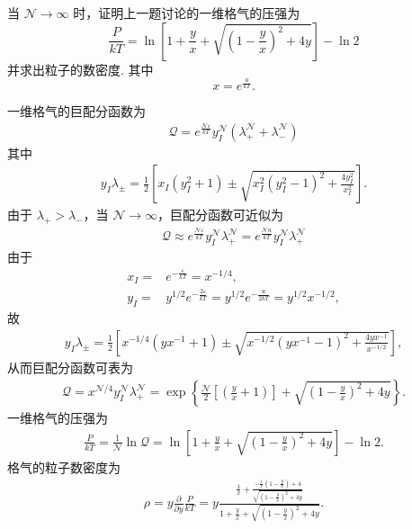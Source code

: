 \documentclass{assignment}
\begin{document}
\begin{prob}
    当 $\mathcal{N}\rightarrow\infty$ 时，证明上一题讨论的一维格气的压强为
    \[
        \frac{P}{kT}=\ln\left[1+\frac{y}{x}+\sqrt{\left(1-\frac{y}{x}\right)^2+4y}\right]-\ln 2
    \]
    并求出粒子的数密度. 其中
    \[
        x=e^{\frac{u}{kT}}.
    \]
\end{prob}
\begin{pf}
    一维格气的巨配分函数为
    \begin{align}
        \mathcal{Q}=e^{\frac{\mathcal{N}\varepsilon}{kT}}y_I^{\mathcal{N}}(\lambda_+^{\mathcal{N}}+\lambda_-^{\mathcal{N}})
    \end{align}
    其中
    \begin{align}
        y_I\lambda_{\pm}=\frac{1}{2}\left[x_I(y_I^2+1)\pm\sqrt{x_I^2(y_I^2-1)^2+\frac{4y_I^2}{x_I^2}}\right].
    \end{align}
    由于 $\lambda_+>\lambda_-$，当 $\mathcal{N}\rightarrow\infty$，巨配分函数可近似为
    \begin{align}
        \mathcal{Q}\approx e^{\frac{\mathcal{N}\varepsilon}{kT}}y_I^{\mathcal{N}}\lambda_+^{\mathcal{N}}=e^{\frac{\mathcal{N}u}{kT}}y_I^{\mathcal{N}}\lambda_+^{\mathcal{N}}
    \end{align}
    由于
    \begin{align}
        x_I=&e^{-\frac{\varepsilon}{kT}}=x^{-1/4},\\
        y_I=&y^{1/2}e^{-\frac{2\varepsilon}{kT}}=y^{1/2}e^{-\frac{u}{2kT}}=y^{1/2}x^{-1/2},
    \end{align}
    故
    \begin{align}
        y_I\lambda_{\pm}=\frac{1}{2}\left[x^{-1/4}(yx^{-1}+1)\pm\sqrt{x^{-1/2}(yx^{-1}-1)^2+\frac{4yx^{-1}}{x^{-1/2}}}\right],
    \end{align}
    从而巨配分函数可表为
    \begin{align}
        \mathcal{Q}=x^{\mathcal{N}/4}y_I^{\mathcal{N}}\lambda_+^{\mathcal{N}}=\exp\left\{\frac{\mathcal{N}}{2}\left[\left(\frac{y}{x}+1\right)\right]+\sqrt{\left(1-\frac{y}{x}\right)^2+4y}\right\}.
    \end{align}
    一维格气的压强为
    \begin{align}
        \frac{P}{kT}=\frac{1}{\mathcal{N}}\ln\mathcal{Q}=\ln\left[1+\frac{y}{x}+\sqrt{\left(1-\frac{y}{x}\right)^2+4y}\right]-\ln 2.
    \end{align}
    格气的粒子数密度为
    \begin{align}
        \rho=y\frac{\partial}{\partial y}\frac{P}{kT}=y\frac{\frac{1}{x}+\frac{-\frac{1}{x}\left(1-\frac{y}{x}\right)+4}{\sqrt{(1-\frac{y}{x})^2+4y}}}{1+\frac{y}{x}+\sqrt{\left(1-\frac{y}{x}\right)^2+4y}}.
    \end{align}
\end{pf}
\end{document}
